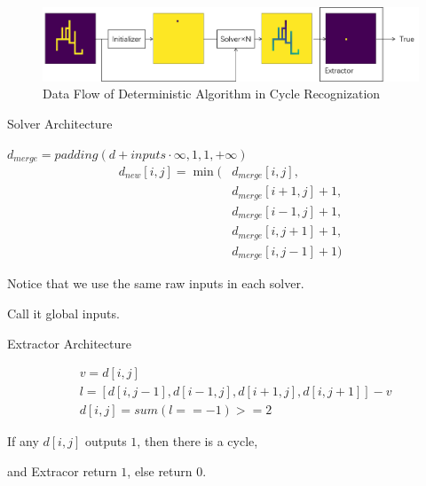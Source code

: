\documentclass[serif]{beamer}
\begin{document}
\begin{frame}

	\begin{figure}[H] %
		\centering %
		\includegraphics[width=1.0\textwidth]{../image/flow.png} %
		\caption{Data Flow of Deterministic Algorithm in Cycle Recognization} %
		\label{Fig.Flow} %
	\end{figure}

\end{frame}

\begin{frame}{Solver Architecture}

	$d_{merge} = padding(d + inputs \cdot \infty, 1, 1, +\infty)$
	\begin{align*}
		d_{new}[i,j] = \min( & d_{merge}[i,j],        \\
		                     & d_{merge}[i+1, j] + 1, \\
		                     & d_{merge}[i-1, j] + 1, \\
		                     & d_{merge}[i, j+1] + 1, \\
		                     & d_{merge}[i, j-1] + 1)
	\end{align*}

	Notice that we use the same raw inputs in each solver.

	Call it global inputs.

\end{frame}

\begin{frame}{Extractor Architecture}

	\begin{align*}
		 & v = d[i,j]                                       \\
		 & l = [d[i,j-1], d[i-1,j], d[i+1,j], d[i,j+1]] - v \\
		 & d[i,j] = sum(l == -1) >= 2
	\end{align*}

    \begin{center}

    If any $d[i,j]$ outputs $1$, then there is a cycle, 
    
    and Extracor return $1$, else return $0$.

    \end{center}

\end{frame}
\end{document}
